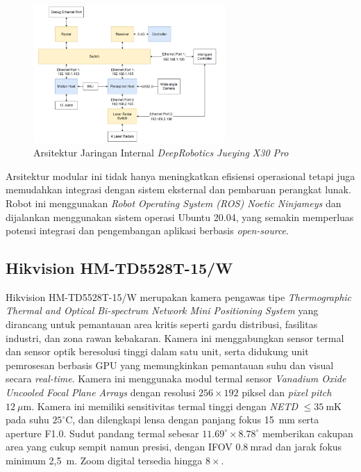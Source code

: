 \begin{figure}[H]
  \centering
  \includegraphics[width=0.65\textwidth]{gambar/bab2/network-x30.png}
  \caption{Arsitektur Jaringan Internal \emph{DeepRobotics Jueying X30 Pro} \cite{deeprobotics_jueyingx30}}
  \label{fig:network_architecture_x30pro}
\end{figure}


Arsitektur modular ini tidak hanya meningkatkan efisiensi operasional tetapi juga memudahkan integrasi dengan sistem eksternal dan pembaruan perangkat lunak. Robot ini menggunakan \emph{Robot Operating System (ROS) Noetic Ninjameys} dan dijalankan menggunakan sistem operasi Ubuntu 20.04, yang semakin memperluas potensi integrasi dan pengembangan aplikasi berbasis \emph{open-source}.


\subsection{Hikvision HM-TD5528T-15/W}
Hikvision HM-TD5528T-15/W merupakan kamera pengawas tipe \emph{Thermographic Thermal and Optical Bi-spectrum Network Mini Positioning System} yang dirancang untuk pemantauan area kritis seperti gardu distribusi, fasilitas industri, dan zona rawan kebakaran. Kamera ini menggabungkan sensor termal dan sensor optik beresolusi tinggi dalam satu unit, serta didukung unit pemrosesan berbasis GPU yang memungkinkan pemantauan suhu dan visual secara \emph{real-time}. Kamera ini menggunaka modul termal sensor \emph{Vanadium Oxide Uncooled Focal Plane Arrays} dengan resolusi \(256 \times 192\) piksel dan \emph{pixel pitch} \(12~\mu\text{m}\). Kamera ini memiliki sensitivitas termal tinggi dengan \emph{NETD} \(\leq 35~\text{mK}\) pada suhu \(25^\circ\text{C}\), dan dilengkapi lensa dengan panjang fokus 15~mm serta aperture F1.0. Sudut pandang termal sebesar \(11.69^\circ \times 8.78^\circ\) memberikan cakupan area yang cukup sempit namun presisi, dengan IFOV \(0.8~\text{mrad}\) dan jarak fokus minimum 2{,}5~m. Zoom digital tersedia hingga \(8 \times\).

